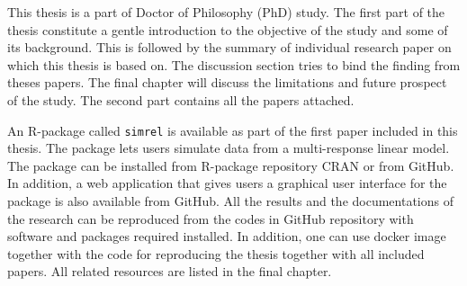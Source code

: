 This thesis is a part of Doctor of Philosophy (PhD) study. The first
part of the thesis constitute a gentle introduction to the objective of
the study and some of its background. This is followed by the summary of
individual research paper on which this thesis is based on. The
discussion section tries to bind the finding from theses papers. The
final chapter will discuss the limitations and future prospect of the
study. The second part contains all the papers attached.

An R-package called \texttt{simrel} is available as part of the first
paper included in this thesis. The package lets users simulate data from
a multi-response linear model. The package can be installed from
R-package repository CRAN or from GitHub. In addition, a web application
that gives users a graphical user interface for the package is also
available from GitHub. All the results and the documentations of the
research can be reproduced from the codes in GitHub repository with
software and packages required installed. In addition, one can use
docker image together with the code for reproducing the thesis together
with all included papers. All related resources are listed in the final
chapter.
